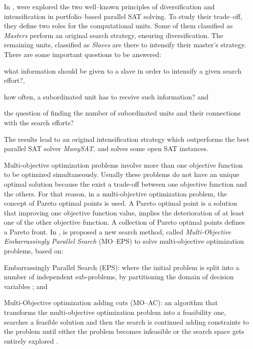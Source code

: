 In \cite{Guo2010}, were explored the two well--known principles of diversification and intensification in portfolio--based parallel SAT solving. To study their trade--off, they define two roles for the computational units. Some of them classified as {\it Masters} perform an original search strategy, ensuring diversification. The remaining units, classified as {\it Slaves} are there to intensify their master's strategy. There are some important questions to be answered:
\begin{inparaenum}[i)]
	\item what information should be given to a slave in order to intensify a given search effort?, 
	\item how often, a subordinated unit has to receive such information? and 
	\item the question of finding the number of subordinated units and their connections with the search efforts? 
\end{inparaenum}
The results lead to an original intensification strategy which outperforms the best parallel SAT solver {\it ManySAT}, and solves some open SAT instances.

Multi-objective optimization problems involve more than one objective function to be optimized simultaneously. Usually these problems do not have an unique optimal solution because the exist a trade-off between one objective function and the others. For that reason, in a multi-objective optimization problem, the concept of Pareto optimal points is used. A Pareto optimal point is a solution that improving one objective function value, implies the deterioration of at least one of the other objective function. A collection of Pareto optimal points defines a Pareto front. In \cite{Yasuhara2015}, is proposed a new search method, called \textit{Multi-Objective Embarrassingly Parallel Search} (MO--EPS) to solve multi-objective optimization problems, based on: 
\begin{inparaenum}[i)]
	\item Embarrassingly Parallel Search (EPS): where the initial problem is split into a number of independent sub-problems, by partitioning the domain of decision variables \cite{Rezgui2013, Regin2014}; and
	\item Multi-Objective optimization adding cuts (MO--AC): an algorithm that transforms the multi-objective optimization problem into a feasibility one, searches a feasible solution and then the search is continued adding constraints to the problem until either the problem becomes infeasible or the search space gets entirely explored \cite{Kotecha2010}.
\end{inparaenum}

